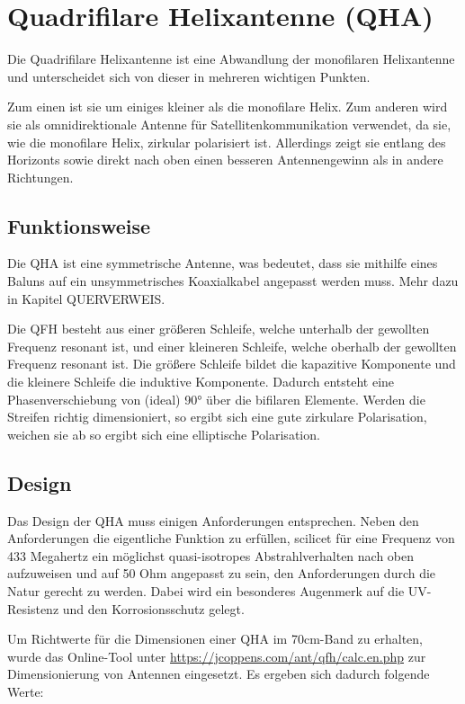 \chapter{Quadrifilare Helixantenne (QHA)}
\label{chap:qfh}
Die Quadrifilare Helixantenne ist eine Abwandlung der monofilaren Helixantenne und unterscheidet sich von dieser in mehreren wichtigen Punkten.

Zum einen ist sie um einiges kleiner als die monofilare Helix. Zum anderen wird sie als omnidirektionale Antenne für Satellitenkommunikation verwendet, da sie, wie die monofilare Helix, zirkular polarisiert ist. Allerdings zeigt sie entlang des Horizonts sowie direkt nach oben einen besseren Antennengewinn als in andere Richtungen.

\section{Funktionsweise}
Die QHA ist eine symmetrische Antenne, was bedeutet, dass sie mithilfe eines Baluns auf ein unsymmetrisches Koaxialkabel angepasst werden muss. Mehr dazu in Kapitel QUERVERWEIS.

Die QFH besteht aus einer größeren Schleife, welche unterhalb der gewollten Frequenz resonant ist, und einer kleineren Schleife, welche oberhalb der gewollten Frequenz resonant ist. Die größere Schleife bildet die kapazitive Komponente und die kleinere Schleife die induktive Komponente. Dadurch entsteht eine Phasenverschiebung von (ideal) 90° über die bifilaren Elemente. Werden die Streifen richtig dimensioniert, so ergibt sich eine gute zirkulare Polarisation, weichen sie ab so ergibt sich eine elliptische Polarisation.

\section{Design}
Das Design der QHA muss einigen Anforderungen entsprechen. Neben den Anforderungen die eigentliche Funktion zu erfüllen, scilicet für eine Frequenz von 433 Megahertz ein möglichst quasi-isotropes Abstrahlverhalten nach oben aufzuweisen und auf 50 Ohm angepasst zu sein, den Anforderungen durch die Natur gerecht zu werden. Dabei wird ein besonderes Augenmerk auf die UV-Resistenz und den Korrosionsschutz gelegt. 

Um Richtwerte für die Dimensionen einer QHA im 70cm-Band zu erhalten, wurde das Online-Tool unter \url{https://jcoppens.com/ant/qfh/calc.en.php} zur Dimensionierung von Antennen eingesetzt. Es ergeben sich dadurch folgende Werte:

